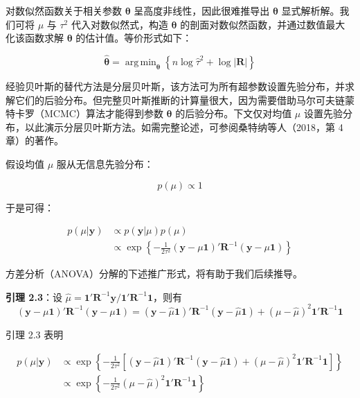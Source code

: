 \documentclass{ctexart}
\DeclareMathOperator*{\argmin}{arg\,min}
\begin{document}
对数似然函数关于相关参数 $\boldsymbol{\theta}$ 呈高度非线性，因此很难推导出 $\boldsymbol{\theta}$ 显式解析解。我们可将 $\mu$ 与 $\tau^2$ 代入对数似然式，构造 $\boldsymbol{\theta}$ 的剖面对数似然函数，并通过数值最大化该函数求解 $\boldsymbol{\theta}$ 的估计值。等价形式如下：

\begin{equation*}
\widehat{\boldsymbol{\theta}}=\argmin_{\boldsymbol{\theta}}\left\{ n\log\widehat{\tau}^2+\log|\boldsymbol{R}|\right\}
\tag{2.22}
\end{equation*}

经验贝叶斯的替代方法是分层贝叶斯，该方法可为所有超参数设置先验分布，并求解它们的后验分布。但完整贝叶斯推断的计算量很大，因为需要借助马尔可夫链蒙特卡罗（MCMC）算法才能得到参数 $\boldsymbol{\theta}$ 的后验分布。下文仅对均值 $\mu$ 设置先验分布，以此演示分层贝叶斯方法。如需完整论述，可参阅桑特纳等人（2018，第 4 章）的著作。

假设均值 $\mu$ 服从无信息先验分布：

\begin{equation*}
p(\mu)\propto1
\end{equation*}

于是可得：

\begin{align*}
p(\mu|\boldsymbol{y})&\propto p(\boldsymbol{y}|\mu)p(\mu)\\
&\propto\exp\left\{-\frac{1}{2\tau^{2}}(\boldsymbol{y}-\mu\boldsymbol{1})'\boldsymbol{R}^{-1}(\boldsymbol{y}-\mu\boldsymbol{1})\right\}
\end{align*}

方差分析（ANOVA）分解的下述推广形式，将有助于我们后续推导。

\begin{mdquote}
\textbf{引理 2.3}：设 $\widehat{\mu}=\boldsymbol{1}'\boldsymbol{R}^{-1}\boldsymbol{y}/\boldsymbol{1}'\boldsymbol{R}^{-1}\boldsymbol{1}$，则有 \begin{equation*}
(\boldsymbol{y}-\mu\boldsymbol{1})'\boldsymbol{R}^{-1}(\boldsymbol{y}-\mu\boldsymbol{1})=(\boldsymbol{y}-\widehat{\mu}\boldsymbol{1})'\boldsymbol{R}^{-1}(\boldsymbol{y}-\widehat{\mu}\boldsymbol{1})+(\mu-\widehat{\mu})^{2}\boldsymbol{1}'\boldsymbol{R}^{-1}\boldsymbol{1}
\end{equation*}
\end{mdquote}

引理 2.3 表明

\begin{align*}
p(\mu|\boldsymbol{y})&\propto\exp\left\{-\frac{1}{2\tau^{2}}\left[(\boldsymbol{y}-\widehat{\mu}\boldsymbol{1})'\boldsymbol{R}^{-1}(\boldsymbol{y}-\widehat{\mu}\boldsymbol{1})+(\mu-\widehat{\mu})^{2}\boldsymbol{1}'\boldsymbol{R}^{-1}\boldsymbol{1}\right]\right\}\\
&\propto\exp\left\{-\frac{1}{2\tau^{2}}(\mu-\widehat{\mu})^{2}\boldsymbol{1}'\boldsymbol{R}^{-1}\boldsymbol{1}\right\}
\end{align*}
\end{document}
